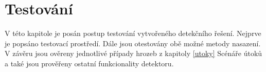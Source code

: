 \documentclass[thesis=M,czech]{FITthesis}[2012/06/26]
\begin{document}
 

\chapter{Testování}
V této kapitole je posán postup testování vytvořeného detekčního řešení. Nejprve je popsáno
testovací prostředí. Dále jsou otestovány obě možné metody nasazení. V závěru jsou ověreny jednotlivé 
případy hrozeb z kapitoly \ref{utoky} Scénáře útoků a také jsou prověřeny ostatní funkcionality
detektoru.

 

\begin{conclusion}
\end{conclusion}




\appendix
\end{document}
